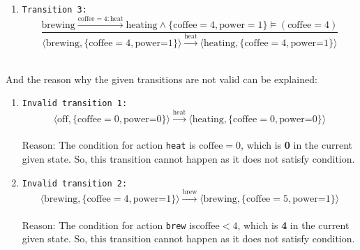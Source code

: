 \documentclass{article}
\begin{document}
\begin{enumerate}[(a)]
\begin{enumerate}[i]
        \item \texttt{Transition 3:}
        $$\frac{
            \text{brewing}\xrightarrow{\text{coffee}=4:\text{heat}} \text{heating}  \wedge \{\text{coffee}=4, \text{power}=1\} \models (\text{coffee}=4)
        }{
            \langle \text{brewing}, \{\text{coffee}=4, \text{power=1}\} \rangle 
            \xrightarrow{\text{heat}}
            \langle \text{heating}, \{\text{coffee}=4, \text{power=1}\} \rangle 
        }$$\\
    \end{enumerate}
    And the reason why the given transitions are not valid can be explained:
    \begin{enumerate}[i]
        \item \texttt{Invalid transition 1:}
        $$
            \langle \text{off}, \{\text{coffee}=0, \text{power=0}\} \rangle 
            \xrightarrow{\text{heat}}
            \langle \text{heating}, \{\text{coffee}=0, \text{power=0}\} \rangle $$\\
        Reason: The condition for action \texttt{heat} is \textbf{$\text{coffee}=0$}, which is \textbf{0} in the current given state. So, this transition cannot happen as it does not satisfy condition.\\
        
        \item \texttt{Invalid transition 2:}
        $$
            \langle \text{brewing}, \{\text{coffee}=4, \text{power=1}\} \rangle 
            \xrightarrow{\text{brew}}
            \langle \text{brewing}, \{\text{coffee}=5, \text{power=1}\} \rangle $$\\
        Reason: The condition for action \texttt{brew} is\textbf{$\text{coffee}<4$}, which is \textbf{4} in the current given state. So, this transition cannot happen as it does not satisfy condition.
    \end{enumerate}


\end{enumerate}
\end{document}
